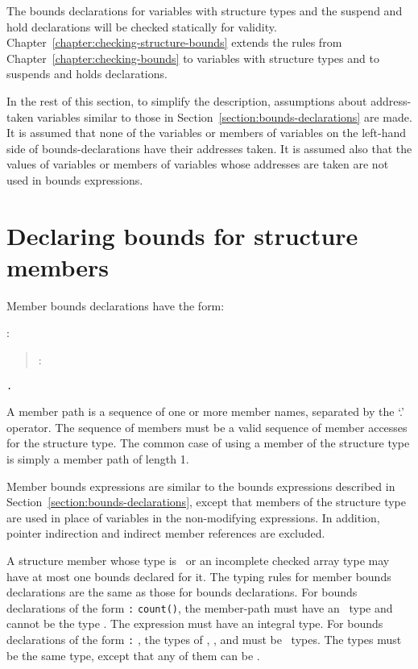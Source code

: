The bounds declarations for variables with structure types and the
suspend and hold declarations will be checked statically for validity.
Chapter~\ref{chapter:checking-structure-bounds} extends the rules 
from Chapter~\ref{chapter:checking-bounds}
to variables with structure
types and to suspends and holds declarations.

In the rest of this section, to simplify the description, assumptions
about address-taken variables similar to those in
Section~\ref{section:bounds-declarations} are made.
It is assumed that none of the variables or members of variables on the
left-hand side of bounds-declarations have their addresses taken. It is
assumed also that the values of variables or members of variables whose
addresses are taken are not used in bounds expressions.

\section{Declaring bounds for structure members}\label{declaring-bounds-for-structure-members}

Member bounds declarations have the form:

:

\begin{quote}
 : 
\end{quote}



 \texttt{.} 

A member path is a sequence of one or more member names, separated by
the `.' operator. The sequence of members must be a valid sequence of
member accesses for the structure type. The common case of using a
member of the structure type is simply a member path of length 1.

Member bounds expressions are similar to the bounds expressions
described in Section~\ref{section:bounds-declarations}, 
except that members of the structure type are
used in place of variables in the non-modifying expressions. In
addition, pointer indirection and indirect member references are
excluded.

A structure member whose type is \arrayptr\ or an incomplete
checked array type may have at most one bounds declared for it. The
typing rules for member bounds declarations are the same as those for
bounds declarations. For bounds declarations of the form
 \texttt{:} \texttt{count(}\texttt{)}, the
member-path must have an \arrayptr\ type and cannot be the type
\arrayptrvoid . The expression
 must have an integral type. For bounds declarations of the
form  \texttt{:} , the types of , , and 
must be \arrayptr\ types. The types must be the same type,
except that any of them can be
\arrayptrvoid .

